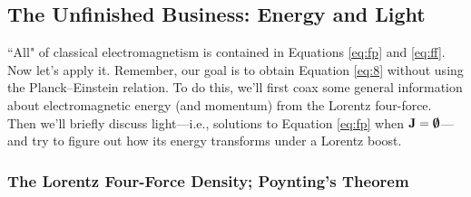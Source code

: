 \documentclass[12pt]{article}
\renewcommand{\vv}[1]{\mathbf{#1}}
\begin{document}
\subsection{The Unfinished Business: Energy and Light}

``All" of classical electromagnetism is contained in Equations \ref{eq:fp} and \ref{eq:ff}. Now let's apply it. Remember, our goal is to obtain Equation \ref{eq:8} without using the Planck--Einstein relation. To do this, we'll first coax some general information about electromagnetic energy (and momentum) from the Lorentz four-force. Then we'll briefly discuss light---i.e., solutions to Equation \ref{eq:fp} when $\vv J = \textrm{\mbox{\boldmath $\emptyset$}}$---and try to figure out how its energy transforms under a Lorentz boost.

\subsubsection[The Lorentz Four-Force Density; Poynting’s Theorem]{The Lorentz Four-Force Density; Poynting's Theorem}\label{sssec:lffd}
\end{document}
